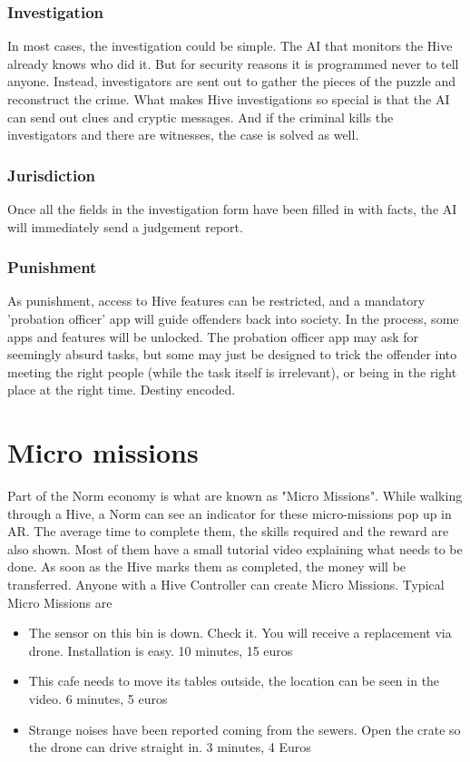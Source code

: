 \subsubsection{Investigation}

In most cases, the investigation could be simple. The AI that monitors the Hive already knows who did it. But for security reasons it is programmed never to tell anyone. Instead, investigators are sent out to gather the pieces of the puzzle and reconstruct the crime.
What makes Hive investigations so special is that the AI can send out clues and cryptic messages. And if the criminal kills the investigators and there are witnesses, the case is solved as well.

\subsubsection{Jurisdiction}

Once all the fields in the investigation form have been filled in with facts, the AI will immediately send a judgement report.

\subsubsection{Punishment}

As punishment, access to Hive features can be restricted, and a mandatory 'probation officer' app will guide offenders back into society. In the process, some apps and features will be unlocked. The probation officer app may ask for seemingly absurd tasks, but some may just be designed to trick the offender into meeting the right people (while the task itself is irrelevant), or being in the right place at the right time. Destiny encoded.

\section{Micro missions}

Part of the Norm economy is what are known as "Micro Missions". While walking through a Hive, a Norm can see an indicator for these micro-missions pop up in AR.
The average time to complete them, the skills required and the reward are also shown.
Most of them have a small tutorial video explaining what needs to be done. As soon as the Hive marks them as completed, the money will be transferred.
Anyone with a Hive Controller can create Micro Missions.
Typical Micro Missions are
\begin{itemize}
    \item The sensor on this bin is down. Check it. You will receive a replacement via drone. Installation is easy. 10 minutes, 15 euros
    \item This cafe needs to move its tables outside, the location can be seen in the video. 6 minutes, 5 euros
    \item Strange noises have been reported coming from the sewers. Open the crate so the drone can drive straight in. 3 minutes, 4 Euros
\end{itemize}

